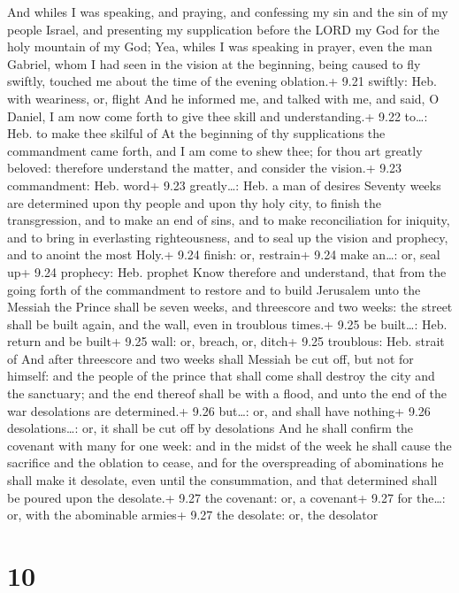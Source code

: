  And whiles I was speaking, and praying, and confessing
my sin and the sin of my people Israel, and presenting my supplication
before the LORD my God for the holy mountain of my God; 
Yea, whiles I was speaking in prayer, even the man Gabriel, whom I had
seen in the vision at the beginning, being caused to fly swiftly,
touched me about the time of the evening oblation.+ 9.21 swiftly: Heb.
with weariness, or, flight  And he informed me, and talked
with me, and said, O Daniel, I am now come forth to give thee skill and
understanding.+ 9.22 to\ldots: Heb. to make thee skilful of
 At the beginning of thy supplications the commandment came
forth, and I am come to shew thee; for thou art greatly beloved:
therefore understand the matter, and consider the vision.+ 9.23
commandment: Heb. word+ 9.23 greatly\ldots: Heb. a man of desires
 Seventy weeks are determined upon thy people and upon thy
holy city, to finish the transgression, and to make an end of sins, and
to make reconciliation for iniquity, and to bring in everlasting
righteousness, and to seal up the vision and prophecy, and to anoint the
most Holy.+ 9.24 finish: or, restrain+ 9.24 make an\ldots: or, seal up+
9.24 prophecy: Heb. prophet  Know therefore and understand,
that from the going forth of the commandment to restore and to build
Jerusalem unto the Messiah the Prince shall be seven weeks, and
threescore and two weeks: the street shall be built again, and the wall,
even in troublous times.+ 9.25 be built\ldots: Heb. return and be built+
9.25 wall: or, breach, or, ditch+ 9.25 troublous: Heb. strait of
 And after threescore and two weeks shall Messiah be cut
off, but not for himself: and the people of the prince that shall come
shall destroy the city and the sanctuary; and the end thereof shall be
with a flood, and unto the end of the war desolations are determined.+
9.26 but\ldots: or, and shall have nothing+ 9.26 desolations\ldots: or,
it shall be cut off by desolations  And he shall confirm
the covenant with many for one week: and in the midst of the week he
shall cause the sacrifice and the oblation to cease, and for the
overspreading of abominations he shall make it desolate, even until the
consummation, and that determined shall be poured upon the desolate.+
9.27 the covenant: or, a covenant+ 9.27 for the\ldots: or, with the
abominable armies+ 9.27 the desolate: or, the desolator

\hypertarget{section-9}{%
\section{10}\label{section-9}}

